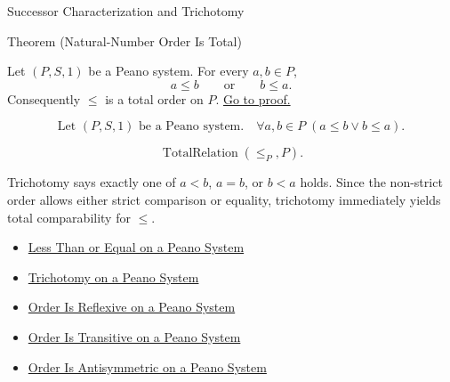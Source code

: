 \begin{topicbox}{Successor Characterization and Trichotomy}
\begin{theorembox}{Theorem (Natural-Number Order Is Total)}
\begin{theorem}
\label{thm:natural-number-order-is-total}
Let $(P,S,1)$ be a Peano system. For every $a,b \in P$,
\[
a \le b
\qquad\text{or}\qquad
b \le a.
\]
Consequently $\le$ is a total order on $P$.
\hyperref[prf:natural-number-order-is-total]{Go to proof.}
\end{theorem}
\end{theorembox}

\begin{remark*}
\[
\text{Let } (P,S,1) \text{ be a Peano system.}\quad
\forall a,b \in P\;(a \le b \lor b \le a).
\]
\end{remark*}

\begin{remark*}
\[
\operatorname{TotalRelation}(\leq_P,P).
\]
\end{remark*}

\begin{remark*}[Interpretation]
Trichotomy says exactly one of $a<b$, $a=b$, or $b<a$ holds. Since the
non-strict order allows either strict comparison or equality, trichotomy
immediately yields total comparability for $\le$.
\end{remark*}

\begin{dependencies}
\begin{itemize}
  \item \hyperref[def:less-than-or-equal-on-peano-system]{Less Than or Equal on a Peano System}
  \item \hyperref[thm:trichotomy-on-peano-system]{Trichotomy on a Peano System}
  \item \hyperref[thm:order-reflexive-on-peano-system]{Order Is Reflexive on a Peano System}
  \item \hyperref[thm:order-transitive-on-peano-system]{Order Is Transitive on a Peano System}
  \item \hyperref[thm:order-antisymmetric-on-peano-system]{Order Is Antisymmetric on a Peano System}
\end{itemize}
\end{dependencies}
\end{topicbox}

